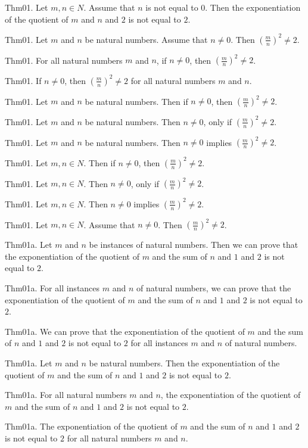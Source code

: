 \documentclass{article}
\begin{document}
Thm01. Let $m , n \in N$. Assume that $n$ is not equal to $0$. Then the exponentiation of the quotient of $m$ and $n$ and $2$ is not equal to $2$.

Thm01. Let $m$ and $n$ be natural numbers. Assume that $n \neq 0$. Then $(\frac{ m}{n})^ {2}\neq 2$.

Thm01. For all natural numbers $m$ and $n$, if $n \neq 0$, then $(\frac{ m}{n})^ {2}\neq 2$.

Thm01. If $n \neq 0$, then $(\frac{ m}{n})^ {2}\neq 2$ for all natural numbers $m$ and $n$.

Thm01. Let $m$ and $n$ be natural numbers. Then if $n \neq 0$, then $(\frac{ m}{n})^ {2}\neq 2$.

Thm01. Let $m$ and $n$ be natural numbers. Then $n \neq 0$, only if $(\frac{ m}{n})^ {2}\neq 2$.

Thm01. Let $m$ and $n$ be natural numbers. Then $n \neq 0$ implies $(\frac{ m}{n})^ {2}\neq 2$.

Thm01. Let $m , n \in N$. Then if $n \neq 0$, then $(\frac{ m}{n})^ {2}\neq 2$.

Thm01. Let $m , n \in N$. Then $n \neq 0$, only if $(\frac{ m}{n})^ {2}\neq 2$.

Thm01. Let $m , n \in N$. Then $n \neq 0$ implies $(\frac{ m}{n})^ {2}\neq 2$.

Thm01. Let $m , n \in N$. Assume that $n \neq 0$. Then $(\frac{ m}{n})^ {2}\neq 2$.

Thm01a. Let $m$ and $n$ be instances of natural numbers. Then we can prove that the exponentiation of the quotient of $m$ and the sum of $n$ and $1$ and $2$ is not equal to $2$.

Thm01a. For all instances $m$ and $n$ of natural numbers, we can prove that the exponentiation of the quotient of $m$ and the sum of $n$ and $1$ and $2$ is not equal to $2$.

Thm01a. We can prove that the exponentiation of the quotient of $m$ and the sum of $n$ and $1$ and $2$ is not equal to $2$ for all instances $m$ and $n$ of natural numbers.

Thm01a. Let $m$ and $n$ be natural numbers. Then the exponentiation of the quotient of $m$ and the sum of $n$ and $1$ and $2$ is not equal to $2$.

Thm01a. For all natural numbers $m$ and $n$, the exponentiation of the quotient of $m$ and the sum of $n$ and $1$ and $2$ is not equal to $2$.

Thm01a. The exponentiation of the quotient of $m$ and the sum of $n$ and $1$ and $2$ is not equal to $2$ for all natural numbers $m$ and $n$.
\end{document}
